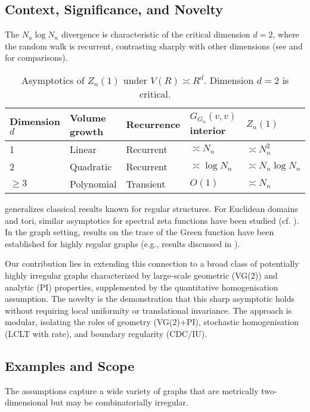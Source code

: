\documentclass{article}
\numberwithin{equation}{section}
\theoremstyle{definition}
\theoremstyle{remark}
\begin{document}
\subsection{Context, Significance, and Novelty}
The $N_n \log N_n$ divergence is characteristic of the critical dimension $d=2$, where the random walk is recurrent, contrasting sharply with other dimensions (see  and  for comparisons).

\begin{table}[h!]
\centering
\small
\caption{Asymptotics of $Z_n(1)$ under $V(R) \asymp R^d$. Dimension $d=2$ is critical.}
\label{tab:growth}
\begin{tabular}{@{}lllll@{}}\toprule
	\textbf{Dimension $d$} & \textbf{Volume growth} & \textbf{Recurrence} & \textbf{$G_{G_n}(v,v)$ interior} & \textbf{$Z_n(1)$} \\
\midrule
1 & Linear & Recurrent & $\asymp N_n$ & $\asymp N_n^{2}$ \\
2 & Quadratic & Recurrent & $\asymp \log N_n$ & $\asymp N_n \log N_n$ \\
$\ge 3$ & Polynomial & Transient & $O(1)$ & $\asymp N_n$ \\
\bottomrule
\end{tabular}
\end{table}

 generalizes classical results known for regular structures. For Euclidean domains and tori, similar asymptotics for spectral zeta functions have been studied (cf. \cite{Colin85, FrankSabin11}). In the graph setting, results on the trace of the Green function have been established for highly regular graphs (e.g., results discussed in \cite{MizunoTachikawa03, Kaimanovich00}).

Our contribution lies in extending this connection to a broad class of potentially highly irregular graphs characterized by large-scale geometric (VG(2)) and analytic (PI) properties, supplemented by the quantitative homogenisation assumption. The novelty is the demonstration that this sharp asymptotic holds without requiring local uniformity or translational invariance. The approach is modular, isolating the roles of geometry (VG(2)+PI), stochastic homogenisation (LCLT with rate), and boundary regularity (CDC/IU).

\subsection{Examples and Scope}
The assumptions capture a wide variety of graphs that are metrically two-dimensional but may be combinatorially irregular.
\end{document}
